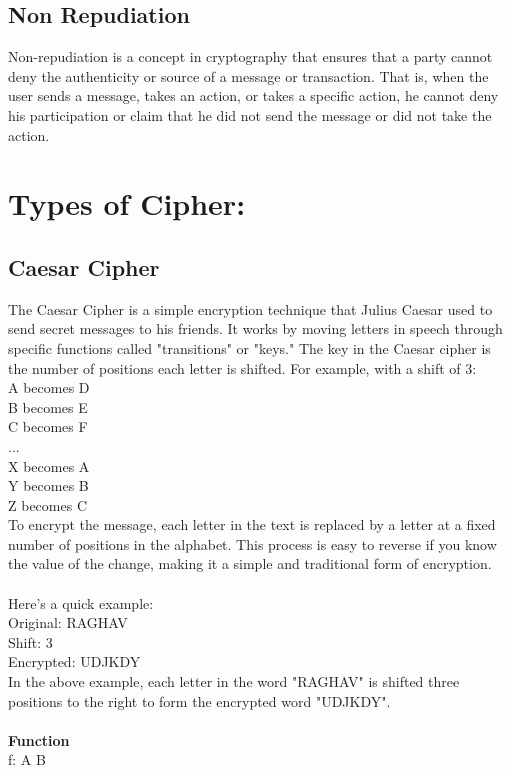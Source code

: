 \documentclass[11pt]{article}
\begin{document}
\subsection{Non Repudiation}
Non-repudiation is a concept in cryptography that ensures that a party cannot deny the authenticity or source of a message or transaction. That is, when the user sends a message, takes an action, or takes a specific action, he cannot deny his participation or claim that he did not send the message or did not take the action.

\section{Types of Cipher:}
\subsection{Caesar Cipher}
The Caesar Cipher is a simple encryption technique that Julius Caesar used to send secret messages to his friends. It works by moving letters in speech through specific functions called "transitions" or "keys."
The key in the Caesar cipher is the number of positions each letter is shifted. For example, with a shift of 3:
\\
A becomes D\\
B becomes E\\
C becomes F\\
...\\
X becomes A\\
Y becomes B\\
Z becomes C\\

To encrypt the message, each letter in the text is replaced by a letter at a fixed number of positions in the alphabet. This process is easy to reverse if you know the value of the change, making it a simple and traditional form of encryption.\\\\
Here's a quick example:
\\
Original: RAGHAV\\
Shift: 3\\
Encrypted: UDJKDY\\


In the above example, each letter in the word "RAGHAV" is shifted three positions to the right to form the encrypted word "UDJKDY".
\\\\
\textbf{Function}\\
f: A \rightarrow{}B \\
\end{document}
